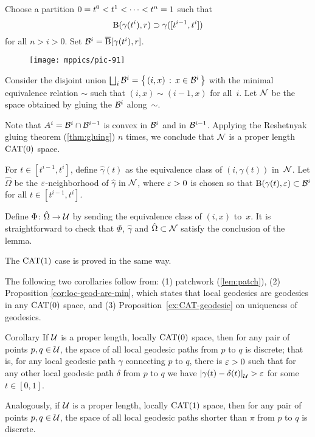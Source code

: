 
Choose a partition $0\z=t^0<t^1<\dots<t^n\z=1$ such that 
\[\mathrm{B}{}(\gamma(t^i),r)\supset \gamma([t^{i-1},t^i])\] for all $n>i>0$.
Set $\mathcal{B}^i=\overline{\mathrm{B}}{}[\gamma(t^i),r]$.

\begin{figure}[h!]
\vskip-0mm
\centering
\texttt{[image: mppics/pic-91]}
\end{figure}

Consider the disjoint union $\bigsqcup_i\mathcal{B}^i=\left\{\,{(i,x)}\,:\,{x\in\mathcal{B}^i}\,\right\}$ with the minimal equivalence relation $\sim$ such that $(i,x)\sim(i-1,x)$ for all~$i$.
Let  $\mathcal{N}$ be the space obtained by gluing the $\mathcal{B}^i$ along~$\sim$.

Note that $A^i=\mathcal{B}^i\cap\mathcal{B}^{i-1}$ is convex in $\mathcal{B}^i$ and in $\mathcal{B}^{i-1}$.
Applying the Reshetnyak gluing theorem (\ref{thm:gluing}) $n$ times, 
we conclude that $\mathcal{N}$ is a proper length $\mathrm{CAT}(0)$ space.

For $t\in[t^{i-1},t^i]$, define $\hat\gamma(t)$ as the equivalence class of $(i,\gamma(t))$ in~$\mathcal{N}$.
Let $\hat\Omega$ be the $\varepsilon$-neighborhood of $\hat\gamma$ in $\mathcal{N}$, where $\varepsilon>0$ is chosen so that $\mathrm{B}{}(\gamma(t),\varepsilon)\subset\mathcal{B}^i$ for all $t\in[t^{i-1},t^i]$.

Define $\Phi\colon\hat\Omega\to\mathcal{U}$
by sending the equivalence class of $(i,x)$ to~$x$.
It is straightforward to check that $\Phi$, 
$\hat\gamma$ and $\hat\Omega\subset\mathcal{N}$ satisfy the conclusion of  the lemma.

The $\mathrm{CAT}(1)$ case is proved in the same way.
\qeds

The following two corollaries follow from:
(1) patchwork (\ref{lem:patch}),
(2) Proposition \ref{cor:loc-geod-are-min}, which states that local geodesics are geodesics in any $\mathrm{CAT}(0)$ space, 
and (3) Proposition~\ref{ex:CAT-geodesic} on uniqueness of geodesics.

\begin{thm}{Corollary}\label{cor:discrete-paths}
If $\mathcal{U}$ is a proper length, locally $\mathrm{CAT}(0)$ space, then for any pair of points $p,q\in\mathcal{U}$, the space of all local geodesic paths from $p$ to $q$ is discrete;
that is, for any local geodesic path $\gamma$ connecting $p$ to $q$, there is $\varepsilon>0$ such that for any other local geodesic path $\delta$ from $p$ to $q$ we have
$\dist{\gamma(t)}{\delta(t)}{\spc{U}}>\eps$ for some $t\in[0,1]$.

Analogously, if $\mathcal{U}$ is a proper length, locally $\mathrm{CAT}(1)$ space, then for any pair of points $p,q\in\mathcal{U}$,  the space of all local geodesic paths shorter than $\pi$ from $p$ to $q$ is discrete.
\end{thm}


